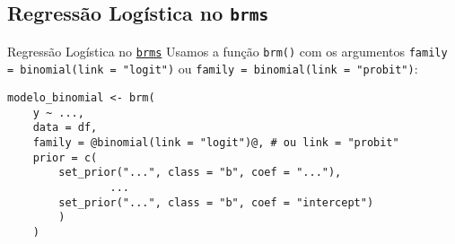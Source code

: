 \subsection{Regressão Logística no \texttt{brms}}
\begin{frame}[fragile]{Regressão Logística no \href{https://paul-buerkner.github.io/brms/}{\texttt{brms}}}
	Usamos a função \texttt{brm()} com os argumentos \texttt{family = binomial(link = "logit")} ou
	\texttt{family = binomial(link = "probit")}:
	\vfill
	\begin{lstlisting}[basicstyle=\small]
    modelo_binomial <- brm(
    y ~ ...,
    data = df,
    family = @binomial(link = "logit")@, # ou link = "probit"
    prior = c(
        set_prior("...", class = "b", coef = "..."),
                ...
        set_prior("...", class = "b", coef = "intercept")
        )
    )
    \end{lstlisting}
\end{frame}
